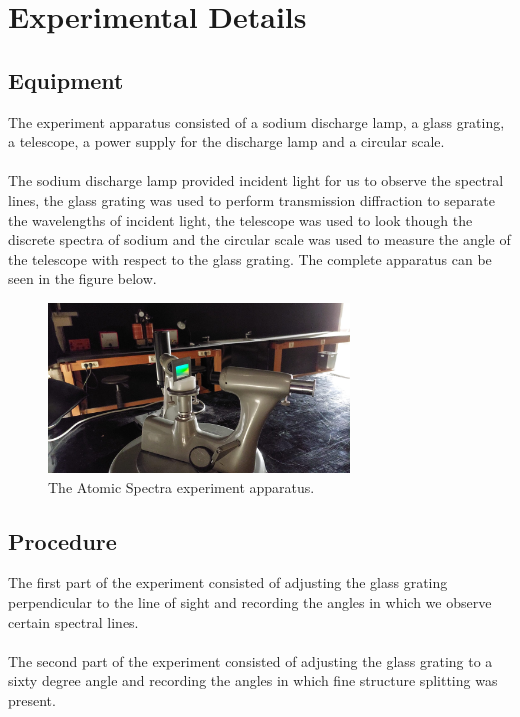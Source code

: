 \section{Experimental Details}

	\subsection{Equipment}
		The experiment apparatus consisted of a sodium discharge lamp, a glass grating, a telescope, a power supply for the discharge lamp and a circular scale. 
		\\
		\\
		The sodium discharge lamp provided incident light for us to observe the spectral lines, the glass grating was used to perform transmission diffraction to separate the wavelengths of incident light, the telescope was used to look though the discrete spectra of sodium and the circular scale was used to measure the angle of the telescope with respect to the glass grating. The complete apparatus can be seen in the figure below.
		\\
		\begin{figure}[h!]
			\centering
			\includegraphics[width=8cm]{images/as_setup.jpeg}
			\caption{The Atomic Spectra experiment apparatus.}
			\label{fig:as_setup}
		\end{figure}
	
	\subsection{Procedure}
		The first part of the experiment consisted of adjusting the glass grating perpendicular to the line of sight and recording the angles in which we observe certain spectral lines. 
		\\
		\\
		The second part of the experiment consisted of adjusting the glass grating to a sixty degree angle and recording the angles in which fine structure splitting was present. 
